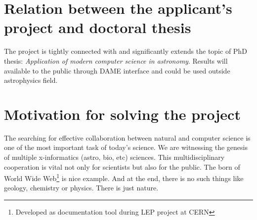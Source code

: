 
\section{Relation between the applicant's project and doctoral thesis}
The project is tightly connected with and significantly extends the
topic of PhD thesis: \textit{Application of modern computer science in
  astronomy}. Results will available to the public through DAME
interface and could be used outside astrophysics field.


\section{Motivation for solving the project}
The searching for effective collaboration between natural and computer
science is one of the most important task of today's science. We are
witnessing the genesis of multiple x-informatics (astro, bio, etc)
sciences. This multidisciplinary cooperation is vital not only for
scientists but also for the public. The born of World Wide
Web\footnote{Developed as documentation tool during LEP project at
  CERN} is nice example. And at the end, there is no such things like
geology, chemistry or physics. There is just nature.





%
